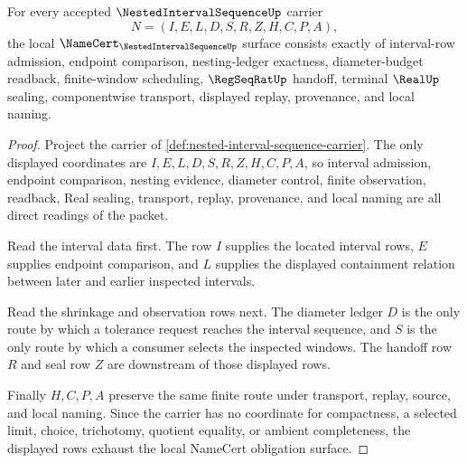 \begin{theorem}
\label{thm:nested-interval-sequence-obligation-surface}
For every accepted $\NestedIntervalSequenceUp$ carrier
$$
N=(I,E,L,D,S,R,Z,H,C,P,A),
$$
the local $\NameCert_{\NestedIntervalSequenceUp}$ surface consists exactly of interval-row admission, endpoint comparison, nesting-ledger exactness, diameter-budget readback, finite-window scheduling, $\RegSeqRatUp$ handoff, terminal $\RealUp$ sealing, componentwise transport, displayed replay, provenance, and local naming.
\end{theorem}
\begin{proof}
Project the carrier of \autoref{def:nested-interval-sequence-carrier}. The only displayed coordinates are $I,E,L,D,S,R,Z,H,C,P,A$, so interval admission, endpoint comparison, nesting evidence, diameter control, finite observation, readback, Real sealing, transport, replay, provenance, and local naming are all direct readings of the packet.

Read the interval data first. The row $I$ supplies the located interval rows, $E$ supplies endpoint comparison, and $L$ supplies the displayed containment relation between later and earlier inspected intervals.

Read the shrinkage and observation rows next. The diameter ledger $D$ is the only route by which a tolerance request reaches the interval sequence, and $S$ is the only route by which a consumer selects the inspected windows. The handoff row $R$ and seal row $Z$ are downstream of those displayed rows.

Finally $H,C,P,A$ preserve the same finite route under transport, replay, source, and local naming. Since the carrier has no coordinate for compactness, a selected limit, choice, trichotomy, quotient equality, or ambient completeness, the displayed rows exhaust the local NameCert obligation surface.
\end{proof}

